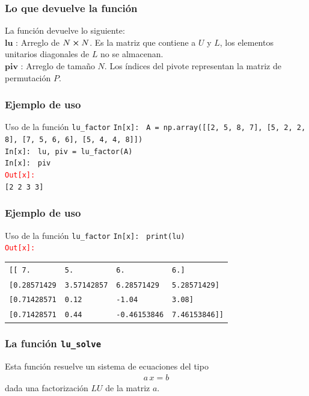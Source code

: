\begin{frame}[fragile]
\frametitle{Lo que devuelve la función}
La función devuelve lo siguiente:
\\
\medskip
$\mathbf{lu}$ : Arreglo de $N \cp N$. Es la matriz que contiene a $U$ y $L$, los elementos unitarios diagonales de $L$ no se almacenan.
\\
\medskip
$\mathbf{piv}$ : Arreglo de tamaño $N$. Los índices del pivote representan la matriz de permutación $P$.
\end{frame}
\begin{frame}
\frametitle{Ejemplo de uso}
\begin{exampleblock}{Uso de la función \texttt{lu\_factor}}
\textcolor{ao}{\texttt{In[x]: }} \texttt{A = np.array([[2, 5, 8, 7], [5, 2, 2, 8], [7, 5, 6, 6], [5, 4, 4, 8]])} \\
\medskip
\pause
\textcolor{ao}{\texttt{In[x]: }} \texttt{lu, piv = lu\_factor(A)} \\
\medskip
\pause
\textcolor{ao}{\texttt{In[x]: }} \texttt{piv} \\
\medskip
\pause
\textcolor{red}{\texttt{Out[x]: }} \\
\texttt{[2 2 3 3]}
\end{exampleblock}
\end{frame}
\begin{frame}
\frametitle{Ejemplo de uso}
\begin{exampleblock}{Uso de la función \texttt{lu\_factor}}
\textcolor{ao}{\texttt{In[x]: }} \texttt{print(lu)} \\
\medskip
\pause
\fontsize{10}{10}\selectfont
\textcolor{red}{\texttt{Out[x]: }} \\
\begin{table}
\begin{tabular}{l l l l}
\texttt{[[ 7.} & \texttt{5.} & \texttt{6.} & \texttt{6.]} \\
\texttt{[0.28571429} & \texttt{3.57142857} & \texttt{6.28571429} & \texttt{5.28571429]} \\
\texttt{[0.71428571} & \texttt{0.12} & \texttt{-1.04} & \texttt{3.08]} \\
\texttt{[0.71428571} & \texttt{0.44} & \texttt{-0.46153846} & \texttt{7.46153846]]}
\end{tabular}
\end{table}
\end{exampleblock}
\end{frame}
\begin{frame}
\frametitle{La función \texttt{lu\_solve}}
Esta función resuelve un sistema de ecuaciones del tipo
\begin{align*}
a \, x = b
\end{align*}
dada una factorización $LU$ de la matriz $a$.
\end{frame}

